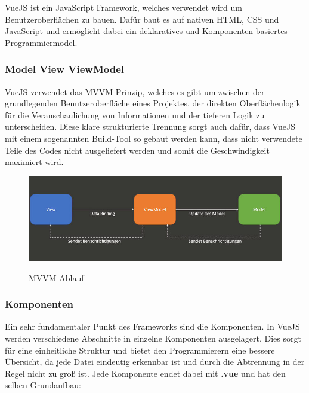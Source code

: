 VueJS ist ein JavaScript Framework, welches verwendet wird um Benutzeroberflächen zu bauen. Dafür baut es auf nativen HTML, CSS und JavaScript und ermöglicht dabei ein deklaratives und Komponenten basiertes Programmiermodel. 
\cite{frontend_web_vuejs_introduction}

\subsubsection{Model View ViewModel}
VueJS verwendet das MVVM-Prinzip, welches es gibt um zwischen der grundlegenden Benutzeroberfläche eines Projektes, der direkten Oberflächenlogik für die Veranschaulichung von Informationen und der tieferen Logik zu unterscheiden. Diese klare strukturierte Trennung sorgt auch dafür, dass VueJS mit einem sogenannten Build-Tool so gebaut werden kann, dass nicht verwendete Teile des Codes nicht ausgeliefert werden und somit die Geschwindigkeit maximiert wird. 

\begin{figure}[h]
    \centering
    \includegraphics[width=1\textwidth]{pics/vuejs-mvvm.jpeg}
    \caption{MVVM Ablauf}
    \cite{frontend_web_mvvm}
    \label{fig:mesh1}
\end{figure}

\cite{frontend_web_mvvm}

\subsubsection{Komponenten}
Ein sehr fundamentaler Punkt des Frameworks sind die Komponenten. In VueJS werden verschiedene Abschnitte in einzelne Komponenten ausgelagert. Dies sorgt für eine einheitliche Struktur und bietet den Programmierern eine bessere Übersicht, da jede Datei eindeutig erkennbar ist und durch die Abtrennung in der Regel nicht zu groß ist. Jede Komponente endet dabei mit \textbf{.vue} und hat den selben Grundaufbau:

\newpage
\cite{frontend_web_vuejs_components}
\newline

